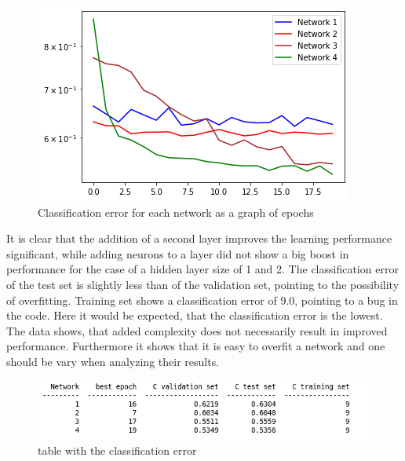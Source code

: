 \documentclass[12pt,A4]{article}
\begin{document}
\parindent=0cm

\begin{figure}
\includegraphics[scale=1]{hw3-1-graph.png}
\begin{center}
\end{center}
\caption{Classification error for each network as a graph of epochs\label{fig}}
\end{figure}
It is clear that the addition of a second layer improves the learning performance significant, while adding neurons to a layer did not show a big boost in performance for the case of a hidden layer size of 1 and 2.
The classification error of the test set is slightly less than of the validation set, pointing to the possibility of overfitting.
Training set shows a classification error of 9.0, pointing to a bug in the code. Here it would be expected, that the classification error is the lowest.
The data shows, that added complexity does not necessarily result in improved performance. Furthermore it shows that it is easy to overfit a network and one should be vary when analyzing their results.
\begin{figure}
\includegraphics[scale=0.7]{hw3-1-table.png}
\begin{center}
\end{center}
\caption{table with the classification error\label{tab}}
\end{figure}
\end{document}
